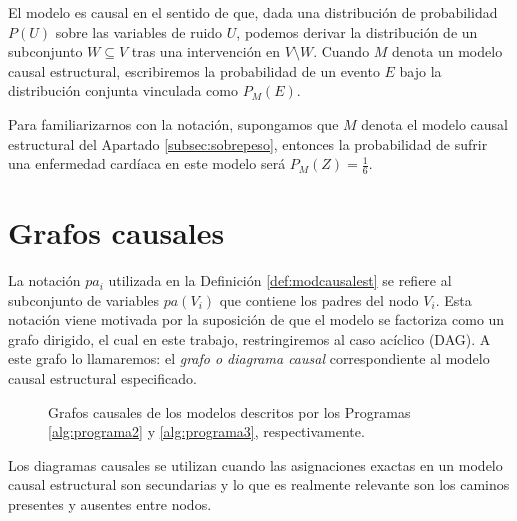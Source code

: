\documentclass[oneside,openright,titlepage,numbers=noenddot,openany,headinclude,footinclude=true,
cleardoublepage=empty,abstractoff,BCOR=5mm,paper=a4,fontsize=12pt,main=spanish]{scrreprt}
\begin{document}
El modelo es causal en el sentido de que, dada una distribución de probabilidad $P(U)$ sobre las variables de ruido $U$, podemos derivar la distribución de un subconjunto $W \subseteq V$ tras una intervención en $V \setminus W$. Cuando $M$ denota un modelo causal estructural, escribiremos la probabilidad de un evento $E$ bajo la distribución conjunta vinculada como $P_M(E)$. 

Para familiarizarnos con la notación, supongamos que $M$ denota el modelo causal estructural del Apartado \ref{subsec:sobrepeso}, entonces la probabilidad de sufrir una enfermedad cardíaca en este modelo será $P_M(Z) = \frac{1}{6}$.

\section{Grafos causales}

La notación $pa_i$ utilizada en la Definición \ref{def:modcausalest} se refiere al subconjunto de variables $pa(V_i)$ que contiene los padres del nodo $V_i$. Esta notación viene motivada por la suposición de que el modelo se factoriza como un grafo dirigido, el cual en este trabajo, restringiremos al caso acíclico (DAG). A este grafo lo llamaremos: el \textit{grafo o diagrama causal} correspondiente al modelo causal estructural especificado.\\

\begin{figure}[h]
\centering
{}
\caption{Grafos causales de los modelos descritos por los Programas \ref{alg:programa2} y \ref{alg:programa3}, respectivamente.}
\end{figure}

Los diagramas causales se utilizan cuando las asignaciones exactas en un modelo causal estructural son secundarias y lo que es realmente relevante son los caminos presentes y ausentes entre nodos. 
\end{document}
